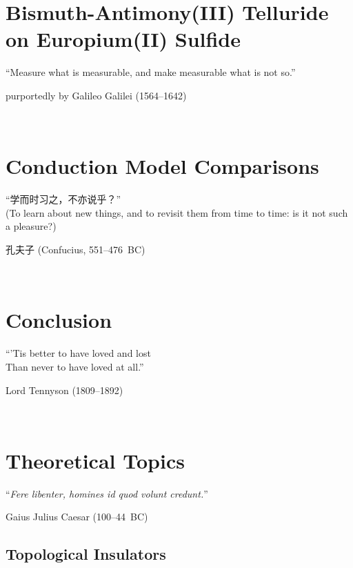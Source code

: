 ﻿\documentclass{report}
\begin{document}
\chapter{Bismuth-Antimony(III) Telluride on Europium(II) Sulfide}\label{ch:bilayer2018}
\epigraph{``Measure what is measurable, and make measurable what is not so.''}{purportedly by Galileo Galilei (1564--1642)}~\\
    

\chapter{Conduction Model Comparisons}\label{ch:models}
    \begin{CJK*}{UTF8}{gkai}
    \epigraph{``学而时习之，不亦说乎？''\\(To learn about new things, and to revisit them from time to time: is it not such a pleasure?)}{孔夫子 (Confucius, 551--476~BC)}~\\
    \end{CJK*}
    

\chapter{Conclusion}\label{ch:conclusion}
\epigraph{``'Tis better to have loved and lost\\Than never to have loved at all.''}{Lord Tennyson (1809--1892)}~\\
    
\appendix
%
%
\chapter{Theoretical Topics}\label{ch:theory}
\epigraph{``\textit{Fere libenter, homines id quod volunt credunt.}''}{Gaius Julius Caesar (100--44~BC)}
    \section{Topological Insulators}\label{sec:ti}
        
\end{document}
